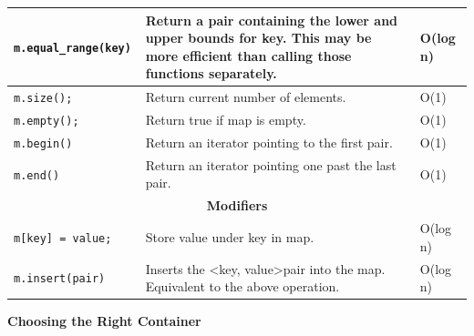 \documentclass[12 pt, twoside] {article}
\begin{document}
{\begin{table}[h]
\begin{tabular}{|p{}|p{}|l|}
\texttt{m.equal\_range(key)  }                                                         & Return a pair containing the lower and upper bounds for key. This may be more efficient than calling those functions separately.                              & O(log n)   \\ \hline
\texttt{m.size();            }                                                         & Return current number of elements.                                                                                                                            & O(1)       \\ \hline
\texttt{m.empty();           }                                                         & Return true if map is empty.                                                                                                                                  & O(1)       \\ \hline
\texttt{m.begin()            }                                                         & Return an iterator pointing to the first pair.                                                                                                                & O(1)       \\ \hline
\texttt{m.end()              }                                                         & Return an iterator pointing one past the last pair.                                                                                                           & O(1)       \\ \hline
\multicolumn{3}{|c|}{\textbf{Modifiers}}                                                                                                                                                                                                                   \\ \hline
\texttt{m{[}key{]} = value;}                                                           & Store value under key in map.                                                                                                                                 & O(log n)   \\ \hline
\texttt{m.insert(pair)     }                                                           & Inserts the \textless key, value\textgreater pair into the map. Equivalent to the above operation.                                                             & O(log n)   \\ \hline
\end{tabular}
\end{table}
\newpage
\textbf{Choosing the Right Container}
}
\end{document}

